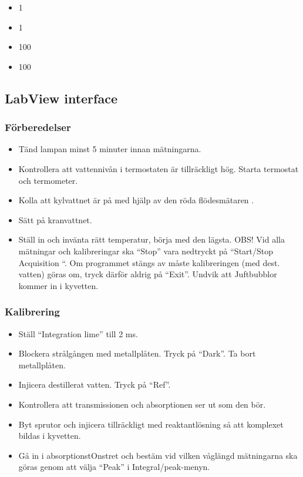 \begin{itemize}
\item \SI{1}{\Molar} 
\item \SI{1}{\Molar} 
\item \SI{100}{\milli\Molar} 
\item \SI{100}{\milli\Molar} 
\end{itemize}

\subsection{LabView interface}
\label{sec:labview}
\subsubsection{Förberedelser}
\begin{itemize}
\item Tänd lampan minst 5 minuter innan mätningarna.
\item Kontrollera att vattennivån i termostaten är tillräckligt hög.
Starta termostat och termometer.
\item Kolla att kylvattnet är på med hjälp av den röda flödesmätaren .
\item Sätt på kranvattnet.
\item Ställ in och invänta rätt temperatur, börja med den lägsta.
OBS! Vid alla mätningar och kalibreringar ska ``Stop'' vara nedtryckt på ``Start/Stop
Acquisition ``. Om programmet stängs av måste kalibreringen (med dest. vatten) göras om,
tryck därför aldrig på ``Exit''. Undvik att Juftbubblor kommer in i kyvetten.
\end{itemize}
\subsubsection{Kalibrering}
\begin{itemize}
\item Ställ ``Integration lime'' till 2 ms.
\item Blockera strålgången med metallplåten. Tryck på ``Dark''. Ta bort metallplåten.
\item Injicera destillerat vatten. Tryck på ``Ref''.
\item Kontrollera att transmissionen och absorptionen ser ut som den bör.
\item Byt sprutor och injicera tillräckligt med reaktantlösning så att komplexet bildas i kyvetten.
\item Gå in i absorptionstOnstret och bestäm vid vilken våglängd mätningarna ska göras genom
att välja ``Peak'' i Integral/peak-menyn.
\end{itemize}
